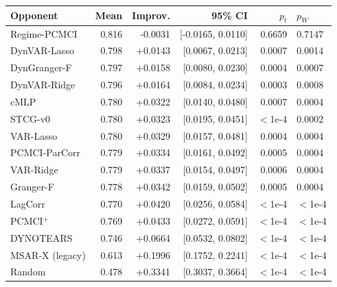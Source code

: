 \begin{tabular}{lrrrrl}
\toprule
Opponent & Mean & Improv. & 95\% CI & $p_t$ & $p_W$ \\
\midrule
Regime-PCMCI & 0.816 & -0.0031 & [-0.0165, 0.0110] & 0.6659 & 0.7147 \\
DynVAR-Lasso & 0.798 & +0.0143 & [0.0067, 0.0213] & 0.0007 & 0.0014 \\
DynGranger-F & 0.797 & +0.0158 & [0.0080, 0.0230] & 0.0004 & 0.0007 \\
DynVAR-Ridge & 0.796 & +0.0164 & [0.0084, 0.0234] & 0.0003 & 0.0008 \\
cMLP & 0.780 & +0.0322 & [0.0140, 0.0480] & 0.0007 & 0.0004 \\
STCG-v0 & 0.780 & +0.0323 & [0.0195, 0.0451] & $<$1e-4 & 0.0002 \\
VAR-Lasso & 0.780 & +0.0329 & [0.0157, 0.0481] & 0.0004 & 0.0004 \\
PCMCI-ParCorr & 0.779 & +0.0334 & [0.0161, 0.0492] & 0.0005 & 0.0004 \\
VAR-Ridge & 0.779 & +0.0337 & [0.0154, 0.0497] & 0.0006 & 0.0004 \\
Granger-F & 0.778 & +0.0342 & [0.0159, 0.0502] & 0.0005 & 0.0004 \\
LagCorr & 0.770 & +0.0420 & [0.0256, 0.0584] & $<$1e-4 & $<$1e-4 \\
PCMCI$^+$ & 0.769 & +0.0433 & [0.0272, 0.0591] & $<$1e-4 & $<$1e-4 \\
DYNOTEARS & 0.746 & +0.0664 & [0.0532, 0.0802] & $<$1e-4 & $<$1e-4 \\
MSAR-X (legacy) & 0.613 & +0.1996 & [0.1752, 0.2241] & $<$1e-4 & $<$1e-4 \\
Random & 0.478 & +0.3341 & [0.3037, 0.3664] & $<$1e-4 & $<$1e-4 \\
\bottomrule
\end{tabular}
